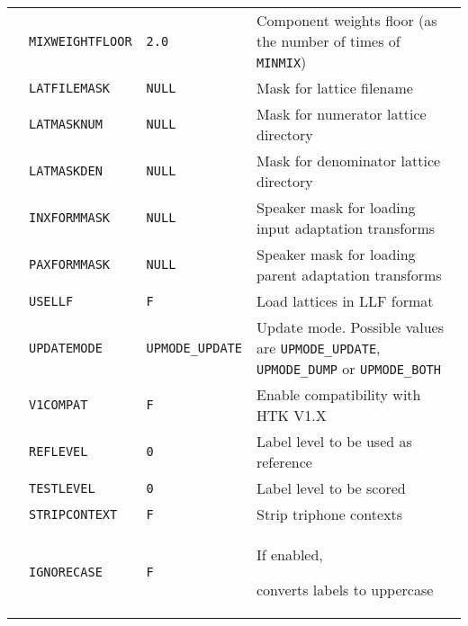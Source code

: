 \begin{center}
\begin{supertabular}{|p{1.8cm}|l|l|p{6.6cm}|}
& \texttt{MIXWEIGHTFLOOR} & \texttt{2.0} & Component weights floor (as the number of times of \texttt{MINMIX}) \\ 


& \texttt{LATFILEMASK} & \texttt{NULL} & Mask for lattice filename \\ 


& \texttt{LATMASKNUM} & \texttt{NULL} & Mask for numerator lattice directory \\ 


& \texttt{LATMASKDEN} & \texttt{NULL} & Mask for denominator lattice directory \\ 


& \texttt{INXFORMMASK} & \texttt{NULL} & Speaker mask for loading input adaptation transforms \\ 


& \texttt{PAXFORMMASK} & \texttt{NULL} & Speaker mask for loading parent adaptation transforms \\ 


& \texttt{USELLF} & \texttt{F} & Load lattices in LLF format \\ 


& \texttt{UPDATEMODE} & \texttt{UPMODE\_UPDATE} & Update mode. Possible values are \texttt{UPMODE\_UPDATE}, \texttt{UPMODE\_DUMP} or \texttt{UPMODE\_BOTH}\\ \hline







 & \texttt{V1COMPAT} & \texttt{F} & Enable compatibility with HTK V1.X \\ \hline







  & \texttt{REFLEVEL} & \texttt{0} & Label level to be used as reference \\ 


  & \texttt{TESTLEVEL} & \texttt{0} & Label level to be scored \\ 


  & \texttt{STRIPCONTEXT} & \texttt{F} & Strip triphone contexts \\ 


 & \texttt{IGNORECASE} & \texttt{F} & If enabled,


  converts labels to uppercase \\ 



\end{supertabular}
\end{center}
